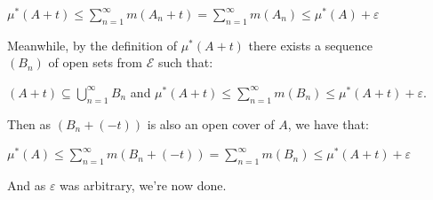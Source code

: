 \documentclass{book}
\newcommand{\hOne}{%
   \color{Black}%
   \fontsize{14}{16}\selectfont%
}
\newenvironment{myIndent}{%
   \begin{adjustwidth}{2.5em}{0em}%
}{%
   \end{adjustwidth}%
}
\newcommand{\mySepTwo}[1][.]{%
   {\noindent\color{#1}{\rule{6.5in}{0.5mm}}}\\%
}
\newcommand{\retTwo}{\hfill\bigbreak}
\begin{document}
\begin{enumerate}
{\begin{myIndent}
      {\centering $\mu^*(A + t) \leq \sum\limits_{n=1}^\infty m(A_n + t) = \sum\limits_{n=1}^\infty m(A_n) \leq \mu^*(A) + \varepsilon$\retTwo\par}

      Meanwhile, by the definition of $\mu^*(A + t)$ there exists a sequence\\ $(B_n)$ of open sets from $\mathcal{E}$ such that:

      {\centering$(A + t) \subseteq \bigcup\limits_{n=1}^\infty B_n$ and $\mu^*(A + t) \leq \sum\limits_{n=1}^\infty m(B_n) \leq \mu^*(A + t) + \varepsilon$.\retTwo\par}

      Then as $(B_n + (-t))$ is also an open cover of $A$, we have that:

      {\centering $\mu^*(A) \leq \sum\limits_{n=1}^\infty m(B_n + (-t)) = \sum\limits_{n=1}^\infty m(B_n) \leq \mu^*(A + t) + \varepsilon$\retTwo\par}

      And as $\varepsilon$ was arbitrary, we're now done.\retTwo
   \end{myIndent}}
\end{enumerate}

\mySepTwo\hOne
\end{document}
